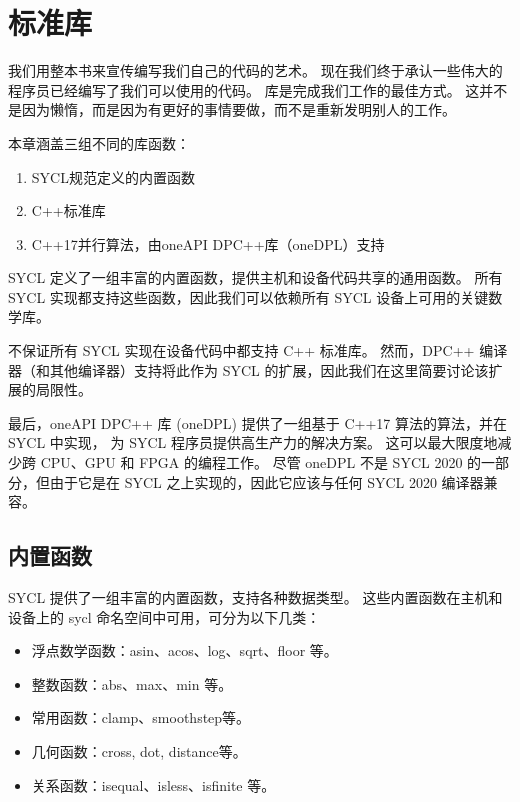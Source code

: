 \section{标准库}
我们用整本书来宣传编写我们自己的代码的艺术。 现在我们终于承认一些伟大的程序员已经编写了我们可以使用的代码。 
库是完成我们工作的最佳方式。 这并不是因为懒惰，而是因为有更好的事情要做，而不是重新发明别人的工作。

本章涵盖三组不同的库函数：

\begin{enumerate}
	\item SYCL规范定义的内置函数

	\item C++标准库

	\item C++17并行算法，由oneAPI DPC++库（oneDPL）支持
\end{enumerate}

SYCL 定义了一组丰富的内置函数，提供主机和设备代码共享的通用函数。 
所有 SYCL 实现都支持这些函数，因此我们可以依赖所有 SYCL 设备上可用的关键数学库。

不保证所有 SYCL 实现在设备代码中都支持 C++ 标准库。 
然而，DPC++ 编译器（和其他编译器）支持将此作为 SYCL 的扩展，因此我们在这里简要讨论该扩展的局限性。

最后，oneAPI DPC++ 库 (oneDPL) 提供了一组基于 C++17 算法的算法，并在 SYCL 中实现，
为 SYCL 程序员提供高生产力的解决方案。 这可以最大限度地减少跨 CPU、GPU 和 FPGA 的编程工作。 
尽管 oneDPL 不是 SYCL 2020 的一部分，但由于它是在 SYCL 之上实现的，因此它应该与任何 SYCL 2020 编译器兼容。

\subsection{内置函数}
SYCL 提供了一组丰富的内置函数，支持各种数据类型。 这些内置函数在主机和设备上的 sycl 命名空间中可用，可分为以下几类：

\begin{itemize}
	\item 浮点数学函数：asin、acos、log、sqrt、floor 等。

	\item 整数函数：abs、max、min 等。

	\item 常用函数：clamp、smoothstep等。

	\item 几何函数：cross, dot, distance等。

	\item 关系函数：isequal、isless、isfinite 等。
\end{itemize}


